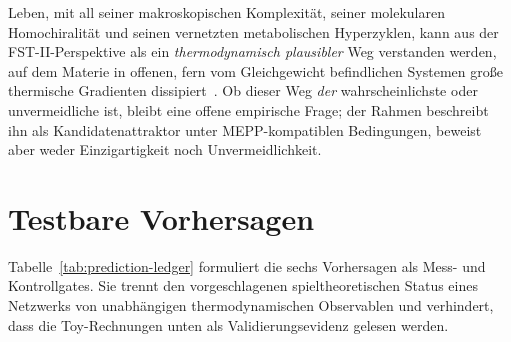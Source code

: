 \documentclass[12pt,a4paper]{article}
\theoremstyle{remark}
\begin{document}
Leben, mit all seiner makroskopischen Komplexität, seiner molekularen Homochiralität und seinen vernetzten metabolischen Hyperzyklen, kann aus der FST-II-Perspektive als ein \emph{thermodynamisch plausibler} Weg verstanden werden, auf dem Materie in offenen, fern vom Gleichgewicht befindlichen Systemen große thermische Gradienten dissipiert~\citep{Bioenergetics}. Ob dieser Weg \emph{der} wahrscheinlichste oder unvermeidliche ist, bleibt eine offene empirische Frage; der Rahmen beschreibt ihn als Kandidatenattraktor unter MEPP-kompatiblen Bedingungen, beweist aber weder Einzigartigkeit noch Unvermeidlichkeit.

\section{Testbare Vorhersagen}
\label{sec:predictions}

Tabelle~\ref{tab:prediction-ledger} formuliert die sechs Vorhersagen als Mess- und Kontrollgates. Sie trennt den vorgeschlagenen spieltheoretischen Status eines Netzwerks von unabhängigen thermodynamischen Observablen und verhindert, dass die Toy-Rechnungen unten als Validierungsevidenz gelesen werden.
\end{document}
